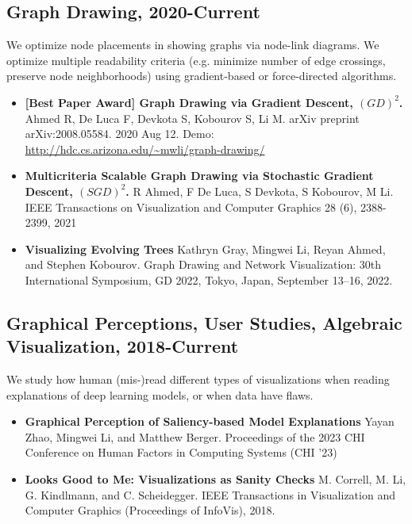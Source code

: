 \documentclass[letterpaper,11pt,oneside]{article}
\begin{document}
\subsection*{Graph Drawing, 2020-Current}
    We optimize node placements in showing graphs via node-link diagrams. We optimize multiple readability criteria (e.g. minimize number of edge crossings, preserve node neighborhoods) using gradient-based or force-directed algorithms. 
\begin{itemize}
    \item \textbf{[Best Paper Award] Graph Drawing via Gradient Descent, $(GD)^2$. }
        Ahmed R, De Luca F, Devkota S, Kobourov S, Li M. 
        arXiv preprint arXiv:2008.05584. 2020 Aug 12. Demo: \url{http://hdc.cs.arizona.edu/~mwli/graph-drawing/}

    \item \textbf{Multicriteria Scalable Graph Drawing via Stochastic Gradient Descent, $(SGD)^2$.}
        R Ahmed, F De Luca, S Devkota, S Kobourov, M Li. 
        IEEE Transactions on Visualization and Computer Graphics 28 (6), 2388-2399, 2021
    \item \textbf{Visualizing Evolving Trees}
        Kathryn Gray, Mingwei Li, Reyan Ahmed, and Stephen Kobourov. 
        Graph Drawing and Network Visualization: 30th International Symposium, GD 2022, Tokyo, Japan, September 13–16, 2022.

\end{itemize}

\subsection*{Graphical Perceptions, User Studies, Algebraic Visualization, 2018-Current}
    We study how human (mis-)read different types of visualizations when reading explanations of deep learning models, or when data have flaws.
    \begin{itemize}
        \item \textbf{Graphical Perception of Saliency-based Model Explanations}
            Yayan Zhao, Mingwei Li, and Matthew Berger.
            Proceedings of the 2023 CHI Conference on Human Factors in Computing Systems (CHI '23)
        \item \textbf{Looks Good to Me: Visualizations as Sanity Checks}
            M. Correll, M. Li, G. Kindlmann, and C. Scheidegger. 
            IEEE Transactions in Visualization and Computer Graphics (Proceedings of InfoVis), 2018.
    \end{itemize}
\end{document}
